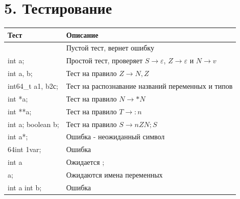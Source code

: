 \documentclass[10pt,a4paper,oneside]{article}
\begin{document}
  
  \section{5. Тестирование}
  
  \begin{center}
    \begin{tabular}{|l|l|}\hline
    Тест & Описание\\ \hline
       & Пустой тест, вернет ошибку\\ \hline
    int a;   & Простой тест, проверяет $S \rightarrow \varepsilon$, $Z \rightarrow \varepsilon$ и $N \rightarrow v$\\ \hline
    int a, b; & Тест на правило $Z \rightarrow N,Z$\\ \hline
    int64\_t a1, b2с; & Тест на распознавание названий переменных и типов\\ \hline
    int *a; & Тест на правило $N \rightarrow *N$\\ \hline
    int **a; & Тест на правило $T \rightarrow :n$\\ \hline
    int a; boolean b; & Тест  на правило $S \rightarrow nZN;S$\\ \hline
    int a*; & Ошибка - неожиданный символ \\ \hline
    64int 1var; & Ошибка\\ \hline
    int a & Ожидается ; \\ \hline
    a; & Ожидаются имена переменных \\ \hline
    int a int b; & Ошибка \\ \hline
    \end{tabular}
  
  \end{center}
\end{document}
